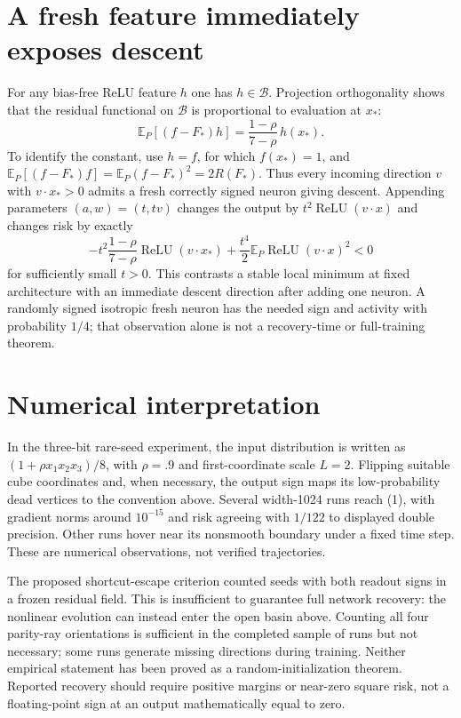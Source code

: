 \documentclass[11pt]{article}
\newcommand{\E}{\mathbb E}\newcommand{\R}{\mathbb R}
\newcommand{\relu}{\operatorname{ReLU}}
\begin{document}
\section{A fresh feature immediately exposes descent}
For any bias-free ReLU feature $h$ one has $h\in\mathcal B$.
Projection orthogonality shows that the residual functional on
$\mathcal B$ is proportional to evaluation at $x_*$:
\[
 \E_P[(f-F_*)h]=\frac{1-\rho}{7-\rho}\,h(x_*).             \tag{4}
\]
To identify the constant, use $h=f$, for which $f(x_*)=1$, and
$\E_P[(f-F_*)f]=\E_P(f-F_*)^2=2R(F_*)$.
Thus every incoming direction $v$ with $v\cdot x_*>0$ admits a fresh
correctly signed neuron giving descent. Appending parameters
$(a,w)=(t,tv)$ changes the output by $t^2\relu(v\cdot x)$ and changes
risk by exactly
\[
 -t^2\frac{1-\rho}{7-\rho}\relu(v\cdot x_*)
       +\frac{t^4}{2}\E_P\relu(v\cdot x)^2<0
\]
for sufficiently small $t>0$. This contrasts a stable local minimum
at fixed architecture with an immediate descent direction after adding
one neuron. A randomly signed isotropic fresh neuron has the needed
sign and activity with probability $1/4$; that observation alone is not
a recovery-time or full-training theorem.

\section{Numerical interpretation}
In the three-bit rare-seed experiment, the input distribution is written
as $(1+\rho x_1x_2x_3)/8$, with $\rho=.9$ and first-coordinate scale
$L=2$. Flipping suitable cube coordinates and, when necessary, the
output sign maps its low-probability dead vertices to the convention
above. Several width-1024 runs reach (1), with gradient norms around
$10^{-15}$ and risk agreeing with $1/122$ to displayed double precision.
Other runs hover near its nonsmooth boundary under a fixed time step.
These are numerical observations, not verified trajectories.

The proposed shortcut-escape criterion counted seeds with both readout
signs in a frozen residual field. This is insufficient to guarantee full
network recovery: the nonlinear evolution can instead enter the open
basin above. Counting all four parity-ray orientations is sufficient in
the completed sample of runs but not necessary; some runs generate
missing directions during training. Neither empirical statement has
been proved as a random-initialization theorem. Reported recovery should
require positive margins or near-zero square risk, not a floating-point
sign at an output mathematically equal to zero.
\end{document}
